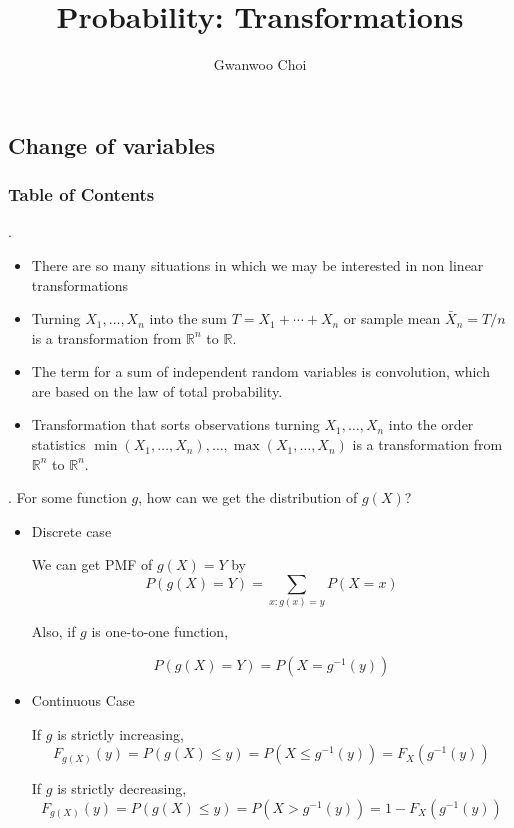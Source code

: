 \documentclass[8pt]{beamer}
\title{Probability: Transformations}
\author{Gwanwoo Choi}
\newcommand{\mbb}[1]{\mathbb{#1}}
\begin{document}

\begin{frame}
    \titlepage
\end{frame}

\subsection{Change of variables}
\begingroup
    \begin{frame}
        \frametitle{Table of Contents}
        \tableofcontents[currentsubsection]
    \end{frame}
\endgroup



\begin{frame}{.}
    \begin{itemize}
        \item There are so many situations in which we may be interested in non linear transformations
        \item Turning $X_1, \dots, X_n$ into the sum $T = X_1 + \cdots + X_n$ or sample mean $\bar{X}_n = T / n$ is a transformation from $\mbb{R}^n$ to $\mbb{R}$.
        \item The term for a sum of independent random variables is convolution, which are based on the law of total probability.
        \item Transformation that sorts observations turning $X_1, \dots, X_n$ into the order statistics $\min (X_1, \dots, X_n), \dots, \max (X_1, \dots, X_n)$ is a transformation from $\mbb{R}^n$ to $\mbb{R}^n$.
    \end{itemize}
\end{frame}

\begin{frame}{.}
    For some function $g$, how can we get the distribution of $g(X)$?

    \begin{itemize}
        \item Discrete case

            We can get PMF of $g(X) = Y$ by
            \[
                P(g(X) = Y) = \sum_{x:g(x) = y} P(X =x)
            \]

            Also, if $g$ is one-to-one function,

            \[
                P(g(X)=Y) = P(X = g^{-1}(y))
            \]
        \item Continuous Case

            If $g$ is strictly increasing,
            \[
                F_{g(X)}(y) = P(g(X) \leq y) = P(X \leq g^{-1}(y)) = F_X(g^{-1}(y))
            \]

            If $g$ is strictly decreasing,
            \[
                F_{g(X)} (y) = P(g(X) \leq y) = P(X > g^{-1}(y)) = 1 - F_X(g^{-1}(y))
            \]
    \end{itemize}
\end{frame}
\end{document}
